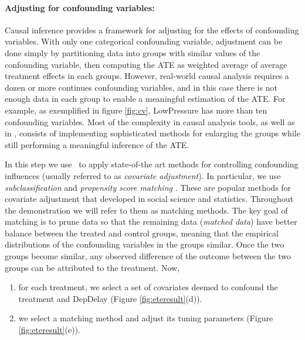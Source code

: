 
 \paragraph{\bf Adjusting for confounding variables:}
Causal inference provides a framework for adjusting for the effects of
confounding variables.
 With only one categorical confounding variable, adjustment can be
 done simply by partitioning data into
 groups with similar values of the confounding variable, then
 computing the ATE as  weighted average of average treatment effects in each groups. However, real-world causal analysis requires a dozen or more continues confounding variables, and in this case there is not enough data in each group to enable a meaningful estimation of the ATE. For example, as exemplified in figure \ref{fig:cv}, LowPressure has more than ten confounding variables.  Most of the complexity in causal analysis tools, as well as in \GSQL, consists of implementing sophisticated methods for enlarging the groups while still performing a meaningful inference of the ATE.
In this step we use \GSQL\ to apply state-of-the art methods for controlling confounding influences (usually referred to as {\em covariate adjustment}).
In particular, we use {\em subclassification} and {\it propensity score matching} \cite{Rubin1983b,IacKinPor09,rosenbaum1984reducing}.
These are popular methods for  covariate adjustment that developed in social science and statistics. Throughout the demonstration we will refer to them as matching methods.
The key goal of matching is to prune data so that
the remaining data ({\em matched data}) have better balance between the treated and control groups, meaning that the empirical distributions of the confounding variables in the groups  similar.
Once the two groups become similar, any observed difference of the outcome between the two groups can be attributed to the treatment. Now,
     \begin{enumerate}
      \item for each treatment, we select a set of covariates deemed to confound the treatment and DepDelay (Figure \ref{fig:eteresult}(d)).
      \item we select a matching method and adjust its tuning parameters (Figure \ref{fig:eteresult}(e)).
\end{enumerate}

